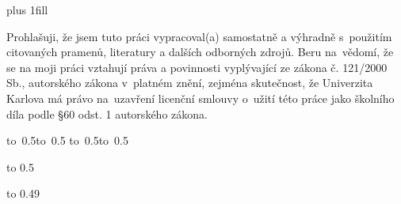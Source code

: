 \newpage


\openright
\hypersetup{pageanchor=true}
\vglue 0pt plus 1fill

\noindent
Prohlašuji, že jsem tuto \ThesisTypeAccusative{} práci vypracoval(a) samostatně a výhradně
s~použitím citovaných pramenů, literatury a dalších odborných zdrojů.
Beru na~vědomí, že se na moji práci vztahují práva a povinnosti vyplývající
ze zákona č. 121/2000 Sb., autorského zákona v~platném znění, zejména skutečnost,
že Univerzita Karlova má právo na~uzavření licenční smlouvy o~užití této
práce jako školního díla podle §60 odst. 1 autorského zákona.

\vspace{10mm}

\hbox{\hbox to 0.5\hbox to 0.5\hsize{\dotfill\quad}}
\smallskip
\hbox{\hbox to 0.5\hsize{}\hbox to 0.5}

\vspace{20mm}
\newpage


\openright

\noindent
\Dedication

\newpage


\openright
{\InfoPageFont

\vtop to 0.5

\vtop to 0.49

}

\newpage


